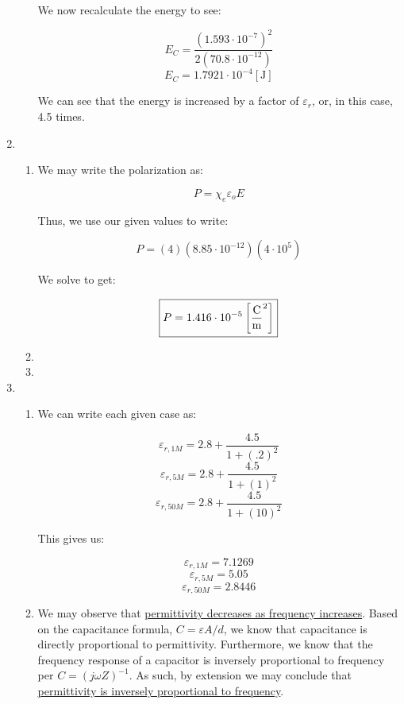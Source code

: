 \begin{enumerate}
\begin{enumerate}
        We now recalculate the energy to see:

        $$E_C=\frac{(1.593\cdot10^{-7})^2}{2(70.8\cdot10^{-12})}$$
        $$\boxed{E_C=1.7921\cdot10^{-4}[\si{\joule}]}$$

        We can see that the energy is increased by a factor of $\varepsilon_r$, or, in this case, 4.5 times.

    \end{enumerate}

  \item

    \begin{enumerate}

      \item We may write the polarization as:

        $$P=\chi_e\varepsilon_oE$$

        Thus, we use our given values to write:

        $$P=(4)(8.85\cdot10^{-12})(4\cdot10^5)$$

        We solve to get:

        $$\boxed{P=1.416\cdot10^{-5}\left[ \si{\coulomb\over\square\meter} \right]}$$

      \item 

      \item 

    \end{enumerate}

  \item

    \begin{enumerate}

      \item We can write each given case as:

        $$\varepsilon_{r,1M}=2.8+\frac{4.5}{1+(.2)^2}$$
        $$\varepsilon_{r,5M}=2.8+\frac{4.5}{1+(1)^2}$$
        $$\varepsilon_{r,50M}=2.8+\frac{4.5}{1+(10)^2}$$

        This gives us:

        $$\boxed{\varepsilon_{r,1M}=7.1269}$$
        $$\boxed{\varepsilon_{r,5M}=5.05}$$
        $$\boxed{\varepsilon_{r,50M}=2.8446}$$

      \item We may observe that \underline{permittivity decreases as frequency increases}. Based on the capacitance formula, $C=\varepsilon A/d$, we know that capacitance is directly proportional to permittivity. Furthermore, we know that the frequency response of a capacitor is inversely proportional to frequency per $C=(j\omega Z)^{-1}$. As such, by extension we may conclude that \underline{permittivity is inversely proportional to frequency}.


\end{enumerate}
\end{enumerate}
